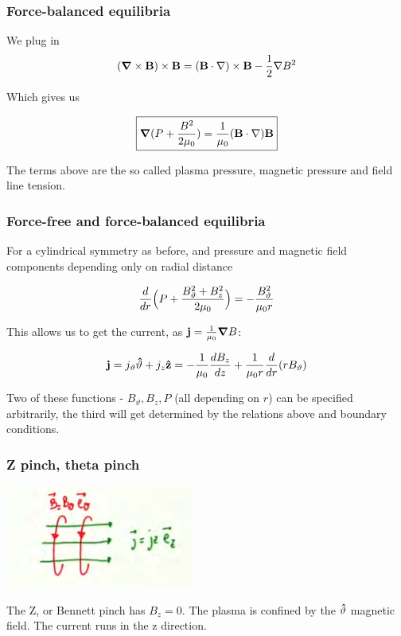 \documentclass[PlasmaNotes.tex]{subfiles}
\begin{document}
\subsubsection{Force-balanced equilibria}

We plug in
\[\mathbf{(\mbox{\boldmath$ \nabla $} \times \mathbf{B})} \times \mathbf{B} = \mathbf{(\mathbf{B} \cdot \mathbf{\nabla})} \times \mathbf{B} - \frac{1}{2} \nabla B^2 \]

Which gives us

\begin{equation}
\boxed{ \mbox{\boldmath$ \nabla $} (P + \frac{B^2}{2\mu_0}) = \frac{1}{\mu_0} (\mathbf{B} \cdot \mathbf{\nabla}) \mathbf{B} }
\end{equation}

The terms above are the so called plasma pressure, magnetic pressure and field line tension.

\subsubsection{Force-free and force-balanced equilibria}

For a cylindrical symmetry as before, and pressure and magnetic field components depending only on radial distance

\[ \frac{d }{d r} \Big(P + \frac{B_{\vartheta}^2+B_z^2}{2\mu_0}\Big) = - \frac{B_{\vartheta}^2}{\mu_0 r} \]

This allows us to get the current, as $\mathbf{j} = \frac{1}{\mu_0} \mbox{\boldmath$ \nabla $} B$:

\[\mathbf{j} = j_{\vartheta} \mathbf{\hat{\vartheta}} + j_z \mathbf{\hat{z}} = -\frac{1}{\mu_0} \frac{d B_z}{d z} + \frac{1}{\mu_0 r} \frac{d }{d r}(r B_{\vartheta}) \]

Two of these functions - $B_{\vartheta}, B_z, P$ (all depending on $r$) can be specified arbitrarily, the third will get determined by the relations above and boundary conditions. 

\subsubsection{Z pinch, theta pinch}

\includegraphics{zpinch}

The Z, or Bennett pinch has $B_z=0$. The plasma is confined by the $\mathbf{\hat{\vartheta}}$ magnetic field. The current runs in the z direction.
\end{document}
